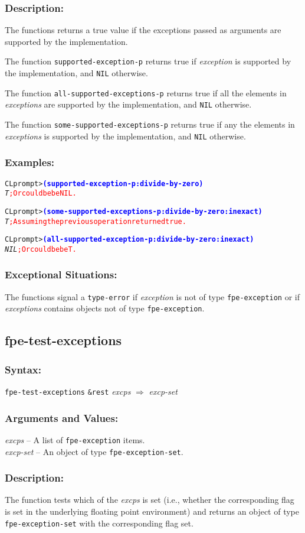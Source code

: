 \documentclass[10pt,fleqn]{article}
\newcommand{\code}[1]{\texttt{#1}}
\newcommand{\varname}[1]{\textit{#1}}
\newcommand{\codeprompt}[1]{\textcolor{blue}{\textbf{#1}}}
\newcommand{\DDictionaryItem}[1]{\vspace*{6pt}\noindent\hrulefill\vspace*{-9pt}\subsection*{#1}}
\newcommand{\DSyntax}{\subsubsection*{Syntax:}}
\newcommand{\DArgsNValues}{\subsubsection*{Arguments and Values:}}
\newcommand{\DDescription}{\subsubsection*{Description:}}
\newcommand{\DExamples}{\subsubsection*{Examples:}}
\newcommand{\DExceptional}{\subsubsection*{Exceptional Situations:}}
\begin{document}
\DDescription{}

The functions returns a true value if the exceptions passed as
arguments are supported by the implementation.

The function \code{supported-exception-p} returns true if 
\varname{exception} is supported by the implementation, and \code{NIL}
otherwise.

The function \code{all-supported-exceptions-p} returns true if all the
elements in \varname{exceptions} are supported by the implementation,
and \code{NIL} otherwise.

The function \code{some-supported-exceptions-p} returns true if any the
elements in \varname{exceptions} is supported by the implementation,
and \code{NIL} otherwise.

\DExamples{}

\begin{alltt}
CL prompt> \codeprompt{(supported-exception-p :divide-by-zero)}
\textit{T} \textcolor{red}{; Or could be be NIL.}

CL prompt> \codeprompt{(some-supported-exceptions-p :divide-by-zero :inexact)}
\textit{T} \textcolor{red}{; Assuming the previous operation returned true.}

CL prompt> \codeprompt{(all-supported-exception-p :divide-by-zero :inexact)}
\textit{NIL} \textcolor{red}{; Or could be be T.}
\end{alltt}

\DExceptional{}

The functions signal a \code{type-error} if \varname{exception}
is not of type \code{fpe-exception} or if \varname{exceptions} contains
objects not of type \code{fpe-exception}.


\DDictionaryItem{fpe-test-exceptions}

\DSyntax{}

\code{fpe-test-exceptions} \code{\&rest} \varname{excps}
$\Rightarrow$ \varname{excp-set}

\DArgsNValues{}

\varname{excps} -- A list of \code{fpe-exception} items.\\
\varname{excp-set} -- An object of type \code{fpe-exception-set}.

\DDescription{}

The function tests which of the \varname{excps} is set (i.e., whether
the corresponding flag is set in the underlying floating point
environment) and returns an object of type \code{fpe-exception-set}
with the corresponding flag set.
\end{document}
